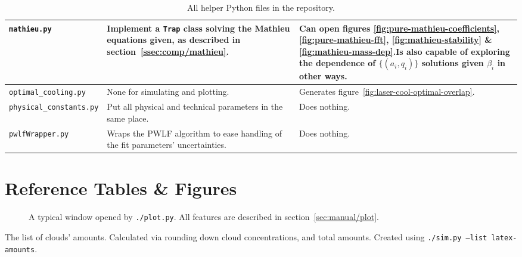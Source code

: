 \begin{sidewaystable}[h]
\begin{tabularx}{\textwidth}{l|X|X}
\hline
\texttt{mathieu.py}             & Implement a \texttt{Trap} class solving the Mathieu equations given, as described in section~\ref{ssec:comp/mathieu}.                                  & Can open figures \ref{fig:pure-mathieu-coefficients}, \ref{fig:pure-mathieu-fft}, \ref{fig:mathieu-stability} \& \ref{fig:mathieu-mass-dep}.Is also capable of exploring the dependence of $\{(a_i, q_i)\}$ solutions given $\beta_i$ in other ways. \\
\hline
\texttt{optimal\_cooling.py}    & None for simulating and plotting.                                                                                                                      & Generates figure~\ref{fig:laser-cool-optimal-overlap}.                                                                                                                                                                                              \\
\hline
\texttt{physical\_constants.py} & Put all physical and technical parameters in the same place.                                                                                           & Does nothing.                                                                                                                                                                                                                                        \\
\hline
\texttt{pwlfWrapper.py}         & Wraps the PWLF algorithm to ease handling of the fit parameters' uncertainties.                                                                        & Does nothing.
\end{tabularx}
\caption{All helper Python files in the repository.}
\label{tbl:helper-scripts}
\end{sidewaystable}

\clearpage
\section{Reference Tables \& Figures}



\begin{sidewaysfigure}[h]
	\begin{center}
	\end{center}
	\caption{A typical window opened by \texttt{./plot.py}. All features are described in section~\ref{sec:manual/plot}.}
	\label{fig:software-plot-example}
\end{sidewaysfigure}

\begin{sidewaystable}[h]

\caption{The list of clouds' amounts. Calculated via rounding down cloud concentrations, and total amounts. Created using \texttt{./sim.py --list latex-amounts}.}
\label{tbl:sim-list-amounts}
\end{sidewaystable}
\restoregeometry
